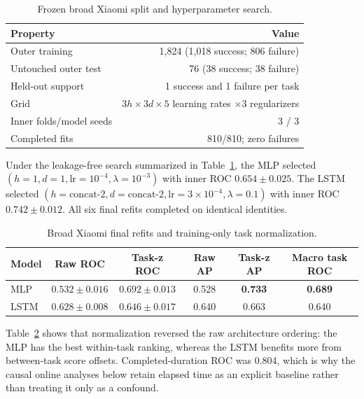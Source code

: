 \documentclass[11pt,a4paper]{article}
\begin{document}
\begin{table}[H]
\centering
\caption{Frozen broad Xiaomi split and hyperparameter search.}
\label{tab:xr1-broad-split}
\begin{tabular}{lr}
\toprule
Property & Value\\
\midrule
Outer training & 1,824 (1,018 success; 806 failure)\\
Untouched outer test & 76 (38 success; 38 failure)\\
Held-out support & 1 success and 1 failure per task\\
Grid & $3h\times3d\times5$ learning rates $\times3$ regularizers\\
Inner folds/model seeds & 3 / 3\\
Completed fits & 810/810; zero failures\\
\bottomrule
\end{tabular}
\end{table}

Under the leakage-free search summarized in Table~\ref{tab:xr1-broad-split},
the MLP selected $(h=1,d=1,\mathrm{lr}=10^{-4},\lambda=10^{-3})$ with inner
ROC $0.654\pm0.025$. The LSTM selected
$(h=\mathrm{concat\mbox{-}2},d=\mathrm{concat\mbox{-}2},
\mathrm{lr}=3\times10^{-4},\lambda=0.1)$ with inner ROC
$0.742\pm0.012$. All six final refits completed on identical identities.

\begin{table}[H]
\centering
\caption{Broad Xiaomi final refits and training-only task normalization.}
\label{tab:xr1-final-normalization}
\begin{tabular}{lccccc}
\toprule
Model & Raw ROC & Task-z ROC & Raw AP & Task-z AP & Macro task ROC\\
\midrule
MLP & $0.532\pm0.016$ & $\mathbf{0.692\pm0.013}$ & 0.528 & \textbf{0.733} & \textbf{0.689}\\
LSTM & $0.628\pm0.008$ & $0.646\pm0.017$ & 0.640 & 0.663 & 0.640\\
\bottomrule
\end{tabular}
\end{table}

Table~\ref{tab:xr1-final-normalization} shows that normalization reversed the raw architecture
ordering: the MLP has the best within-task ranking, whereas the LSTM benefits
more from between-task score offsets. Completed-duration ROC was 0.804, which
is why the causal online analyses below retain elapsed time as an explicit
baseline rather than treating it only as a confound.
\end{document}

